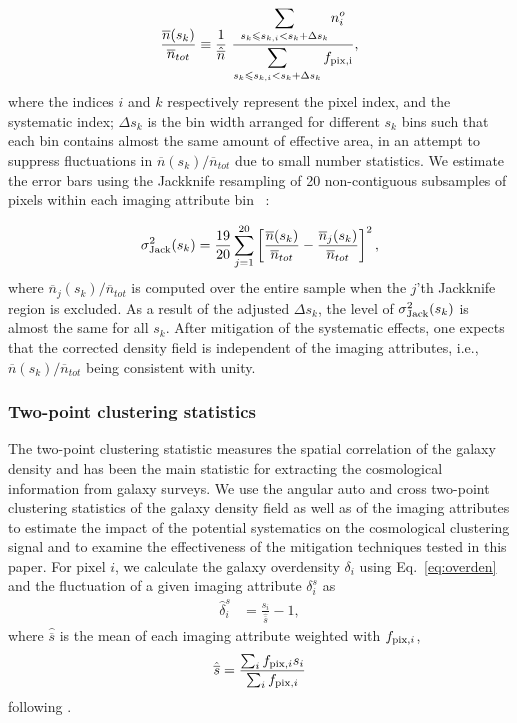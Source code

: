 \begin{equation}\label{eq:nnbar_stat}
    \frac{\overline{n}(s_{k})}{\overline{n}_{tot}} \equiv \frac{1}{\hat{\overline{n}}}~ \frac{\displaystyle\sum_{s_{k}\leq s_{k,i}<s_{k}+\Delta s_{k}} n^{o}_{i}}{\displaystyle\sum_{s_{k}\leq s_{k,i}<s_{k}+\Delta s_{k}} f_{\rm pix, i}},
\end{equation}
where the indices $i$ and $k$ respectively represent the pixel index, and the systematic index; $\Delta s_{k}$ is the bin width arranged for different $s_k$ bins such that each bin contains almost the same amount of effective area, in an attempt to suppress fluctuations in $\overline{n}(s_{k})/\overline{n}_{tot}$ due to small number statistics. We estimate the error bars using the Jackknife resampling of 20 non-contiguous subsamples of pixels within each imaging attribute bin ~\citep[see e.g.][]{ross2011ameliorating}:


\begin{equation}\label{eq:error_jack}
    \sigma^{2}_{{\rm Jack}}(s_{k}) = \frac{19}{20}\sum_{j=1}^{20} \left[    \frac{\overline{n}(s_{k})}{\overline{n}_{tot}} -     \frac{\overline{n}_{j}(s_{k})}{\overline{n}_{tot}}\right]^{2}  ,
\end{equation}
 where $\overline{n}_{j}(s_{k})/\overline{n}_{tot}$ is computed over the entire sample when the $j$'th Jackknife region is excluded.
As a result of the adjusted $\Delta s_{k}$, the level of $\sigma^{2}_{{\rm Jack}}(s_k)$ is almost the same for all $s_k$. After mitigation of the systematic effects, one expects that the corrected density field is independent of the imaging attributes, i.e., $\overline{n}(s_{k})/\overline{n}_{tot}$ being consistent with unity.


\subsubsection{Two-point clustering statistics}
The two-point clustering statistic measures the spatial correlation of the galaxy density and has been the main statistic for extracting the cosmological information from galaxy surveys. We use the angular auto and cross two-point clustering statistics of the galaxy density field as well as of the imaging attributes to estimate the impact of the potential systematics on the cosmological clustering signal and to examine the effectiveness of the mitigation techniques tested in this paper. For pixel $i$, we calculate the galaxy overdensity $\delta_{i}$ using Eq.~\ref{eq:overden} and the fluctuation of a given imaging attribute $\delta^{s}_{i}$ as
\begin{align}\label{eq:delta}
    \hat{\delta}^{s}_{i} &= \frac{s_{i}}{\hat{\overline{s}}} - 1 ,
\end{align}
where $\hat{\overline{s}}$ is the mean of each imaging attribute weighted with $f_{{\rm pix},i}$,
\begin{align}\label{eq:deltasysbar}
\hat{\overline{s}} = \frac{\sum_i f_{{\rm pix},i} s_i}{\sum_i f_{{\rm pix},i}}
\end{align}
following \citet{ross2011ameliorating}.\\

